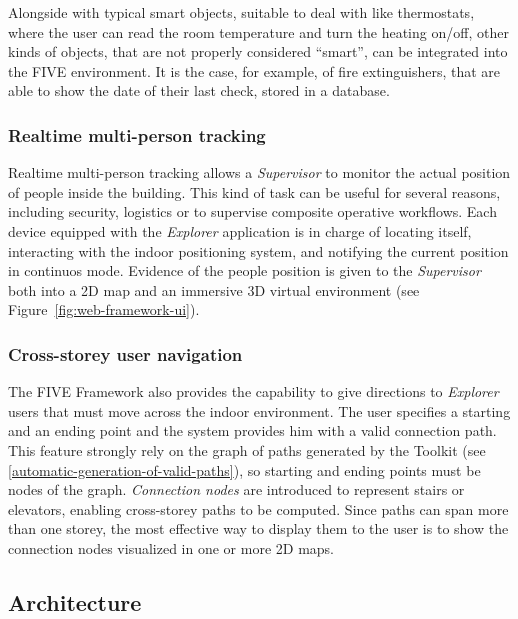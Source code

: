 Alongside with typical smart objects, suitable to deal with like thermostats,
where the user can read the room  temperature and turn the heating on/off,
other kinds of objects, that are not properly considered ``smart'', can be
integrated into the FIVE environment. It is the case, for example, of fire
extinguishers, that are able to show the date of their last check, stored in a
database.

\subsubsection{Realtime multi-person tracking}\label{realtime-multi-person-tracking}

Realtime multi-person tracking allows a \emph{Supervisor} to monitor the
actual position of people inside the building. This kind of task can be useful
for several reasons, including security, logistics or to supervise composite
operative workflows. Each device equipped with the \emph{Explorer} application
is in charge of locating itself, interacting with the indoor positioning
system, and notifying the current position in continuos mode. Evidence of the
people position is given to the \emph{Supervisor} both into a 2D map and an
immersive 3D virtual environment (see Figure~\ref{fig:web-framework-ui}).

\subsubsection{Cross-storey user navigation}\label{cross-storey-user-navigation}

The FIVE Framework also provides the capability to give directions to
\emph{Explorer} users that must move across the indoor environment. The user
specifies a starting and an ending point and the system provides him with a
valid connection path. This feature strongly rely on the graph of paths
generated by the Toolkit (see \ref{automatic-generation-of-valid-paths}), so
starting and ending points must be nodes of the graph. \emph{Connection nodes}
are introduced to represent stairs or elevators, enabling cross-storey paths
to be computed. Since paths can span more than one storey, the most effective
way to display them to the user is to show the connection nodes visualized in
one or more 2D maps.

\subsection{Architecture}\label{architecture}

